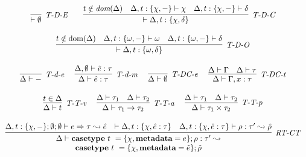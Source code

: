 


\begin{figure}
\centering
\[
\begin{array}{c}
\infer[\textit{T-D-E}]
	{\vdash \emptyset}
	{ } 
~~~~~~
\infer[\textit{T-D-C}]
	{\vdash \Delta, t : \{ \chi, \delta \}}
	{t \notin \textit{dom}(\Delta) & \Delta, t : \{ \chi, - \} \vdash \chi & \Delta, t : \{ \chi, - \} \vdash \delta}\\[3ex]
	
\infer[\textit{T-D-O}]
	{\vdash \Delta, t : \{ \omega, \delta \}}
	{t \notin \text{dom}(\Delta) & \Delta, t : \{ \omega, - \} \vdash \omega & \Delta, t : \{ \omega, - \} \vdash \delta} \\[3ex]

\infer[\textit{T-d-e}]
	{\Delta \vdash -}
	{ }
~~~~
\infer[\textit{T-d-m}]
	{\Delta \vdash \hat{e} : \tau}
	{\Delta, \emptyset \vdash \hat{e} : \tau}
~~~~
\infer[\textit{T-DC-e}]
	{\Delta \vdash \emptyset}
	{ }
~~~~
\infer[\textit{T-DC-t}]
	{\Delta \vdash \Gamma, x : \tau}
	{\Delta \vdash \Gamma & \Delta \vdash \tau}
\\[3ex]
\infer[\textit{T-T-v}]
	{\Delta \vdash t}
	{t \in \Delta}
~~~~
\infer[\textit{T-T-a}]
	{\Delta \vdash \tau_1 \rightarrow \tau_2}
	{\Delta \vdash \tau_1 & \Delta \vdash \tau_2}
~~~~
\infer[\textit{T-T-p}]
	{\Delta \vdash \tau_1 \times \tau_2}
	{\Delta \vdash \tau_1 & \Delta \vdash \tau_2}\\[3ex]
	
\infer[\textit{RT-CT}]
          {\renewcommand{\arraystretch}{1}
	    \begin{array}{c}
	    \Delta \vdash  \keyw{casetype}~ t~=\{\chi, \keyw{metadata}=e\}; \rho :\tau' \leadsto \\
            \keyw{casetype}~ t~=\{\chi, \keyw{metadata}=\hat{e}\};\hat{\rho}
            \end{array}
       }
	  {\Delta, t:\{\chi,-\}; \emptyset; \emptyset \vdash e \Rightarrow \tau \leadsto \hat{e} & \vdash \Delta, t:\{\chi,\hat{e} : \tau\} & \Delta, t:\{\chi, \hat e:\tau\} \vdash \rho :\tau'\leadsto \hat{\rho} }
	   \\[3ex] 
	   

\end{array}\]
\end{figure}
